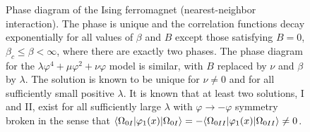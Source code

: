 \begingroup
\renewcommand{\thefigure}{A.2}
\renewcommand{\figurename}{Figure}
\begin{figure}[htbp]
  \centering
  \caption{Phase diagram of the Ising ferromagnet (nearest-neighbor interaction). The phase is unique and the correlation functions decay exponentially for all values of $\beta$ and $B$ except those satisfying $B=0$, $\beta_c\leq\beta<\infty$, where there are exactly two phases. The phase diagram for the $\lambda\varphi^4+\mu\varphi^2+\nu\varphi$ model is similar, with $B$ replaced by $\nu$ and $\beta$ by $\lambda$. The solution is known to be unique for $\nu\ne0$ and for all sufficiently small positive $\lambda$. It is known that at least two solutions, I and II, exist for all sufficiently large $\lambda$ with $\varphi\to-\varphi$ symmetry broken in the sense that $\langle \Omega_{0I}\vert \varphi_1(x)\vert \Omega_{0I}\rangle=-\langle \Omega_{0II}\vert \varphi_1(x)\vert \Omega_{0II}\rangle\ne0$.}
  \label{fig:A-2}
\end{figure}
\endgroup
